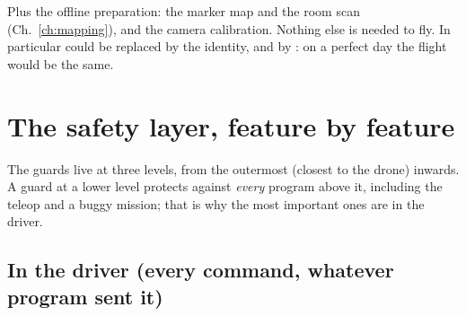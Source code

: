 \noindent Plus the offline preparation: the marker map and the room scan (Ch.~\ref{ch:mapping}), and the camera
calibration. Nothing else is needed to fly. In particular  could be replaced by the identity,
and  by : on a perfect day the flight would be the same.

\section{The safety layer, feature by feature}

The guards live at three levels, from the outermost (closest to the drone) inwards. A guard at a lower level
protects against \emph{every} program above it, including the teleop and a buggy mission; that is why the most
important ones are in the driver.

\subsection{In the driver (every command, whatever program sent it)}

